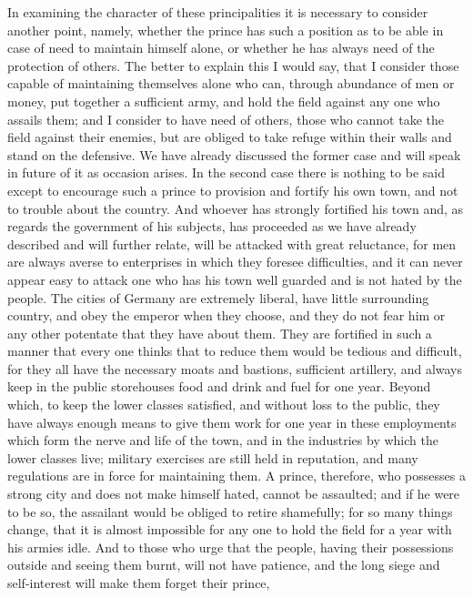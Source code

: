\documentclass[12pt,letterpaper]{memoir}
\begin{document}
In examining the character of these principalities it is necessary to
consider another point, namely, whether the prince has such a position
as to be able in case of need to maintain himself alone, or whether he
has always need of the protection of others. The better to explain this
I would say, that I consider those capable of maintaining themselves
alone who can, through abundance of men or money, put together a
sufficient army, and hold the field against any one who assails them;
and I consider to have need of others, those who cannot take the
field against their enemies, but are obliged to take refuge within
their walls and stand on the defensive. We have already discussed the
former case and will speak in future of it as occasion arises. In
the second case there is nothing to be said except to encourage such
a prince to provision and fortify his own town, and not to trouble
about the country. And whoever has strongly fortified his town and,
as regards the government of his subjects, has proceeded as we have
already described and will further relate, will be attacked with great
reluctance, for men are always averse to enterprises in which they
foresee difficulties, and it can never appear easy to attack one who
has his town well guarded and is not hated by the people. The cities
of Germany are extremely liberal, have little surrounding country, and
obey the emperor when they choose, and they do not fear him or any
other potentate that they have about them. They are fortified in such
a manner that every one thinks that to reduce them would be tedious
and difficult, for they all have the necessary moats and bastions,
sufficient artillery, and always keep in the public storehouses food
and drink and fuel for one year. Beyond which, to keep the lower
classes satisfied, and without loss to the public, they have always
enough means to give them work for one year in these employments which
form the nerve and life of the town, and in the industries by which the
lower classes live; military exercises are still held in reputation,
and many regulations are in force for maintaining them. A prince,
therefore, who possesses a strong city and does not make himself hated,
cannot be assaulted; and if he were to be so, the assailant would
be obliged to retire shamefully; for so many things change, that it
is almost impossible for any one to hold the field for a year with
his armies idle. And to those who urge that the people, having their
possessions outside and seeing them burnt, will not have patience, and
the long siege and self-interest will make them forget their prince,
\end{document}
